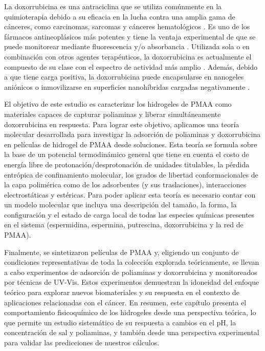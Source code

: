 La doxorrubicina es una antraciclina que se utiliza com\'unmente en la quimioterapia debido a su eficacia en la lucha contra una amplia gama de c\'anceres, como carcinomas, sarcomas y c\'anceres hematol\'ogicos \cite{Panis2012}.
Es uno de los f\'armacos antineopl\'asicos m\'as potentes y tiene la ventaja experimental de que se puede monitorear mediante fluorescencia y/o absorbancia  \cite{serpe2005doxorubicin}.
Utilizada sola o en combinaci\'on con otros agentes terap\'euticos, la doxorrubicina es actualmente el compuesto de su clase con el espectro de actividad m\'as amplio  \cite{carvalho2009}.
Adem\'as, debido a que tiene carga positiva, la doxorrubicina puede encapsularse en nanogeles ani\'onicos \cite{li2019} o inmovilizarse en superficies nanoh\'ibridas cargadas negativamente \cite{kazempour2019}.

El objetivo de este estudio es caracterizar los hidrogeles de PMAA como materiales capaces de capturar poliaminas y liberar simult\'aneamente doxorrubicina en respuesta.
Para lograr este objetivo, aplicamos una teor\'ia molecular desarrollada para investigar la adsorci\'on de poliaminas y doxorrubicina en pel\'iculas de hidrogel de PMAA desde soluciones.
Esta teor\'ia se formula sobre la base de un potencial termodin\'amico general que tiene en cuenta el costo de energ\'ia libre de protonaci\'on/desprotonaci\'on de unidades titulables, la p\'erdida entr\'opica de confinamiento molecular, los grados de libertad conformacionales de la capa polim\'erica como de los adsorbentes (y sus traslaciones),  interacciones electrost\'aticas y est\'ericas.
Para poder aplicar esta teor\'ia es necesario contar con un modelo molecular que incluya una descripci\'on del tama\~no, la forma, la configuraci\'on y el estado de carga local de todas las especies qu\'imicas presentes en el sistema (espermidina, espermina, putrescina, doxorrubicina y la red de PMAA).

Finalmente, se sintetizaron pel\'iculas de PMAA y, eligiendo un conjunto de condiciones representativas de toda la colecci\'on explorada te\'oricamente, se llevan  a cabo experimentos de adsorci\'on de poliaminas y doxorrubicina y monitoreados por t\'ecnicas de UV-Vis.
Estos experimentos demuestran la idoneidad del enfoque te\'orico para explorar nuevos biomateriales y su respuesta en el contexto de aplicaciones relacionadas con el c\'ancer.
En resumen, este cap\'itulo presenta el comportamiento fisicoqu\'imico de los hidrogeles desde una perspectiva te\'orica, lo que permite un estudio sistem\'atico de su respuesta a cambios en el pH, la concentraci\'on de sal y poliaminas, y tambi\'en desde una perspectiva experimental para validar las predicciones de nuestros c\'alculos.


